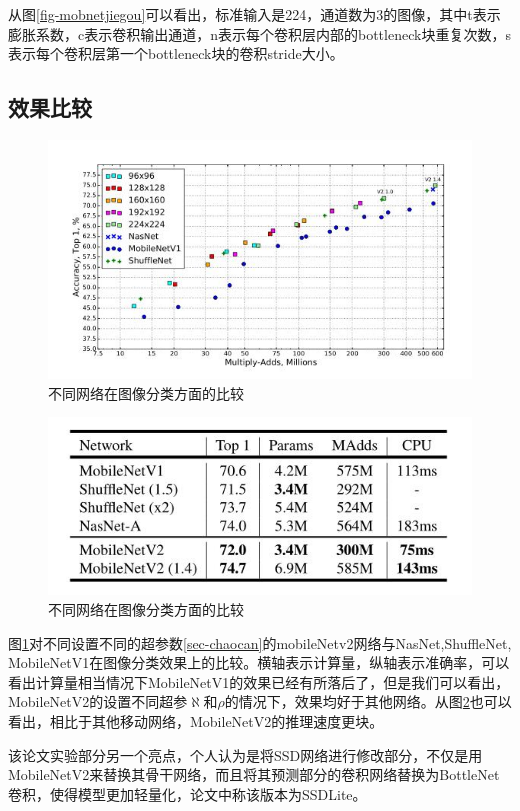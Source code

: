 \documentclass[UTF8,a4paper,12pt]{ctexart}
\begin{document}
从图\ref{fig-mobnetjiegou}可以看出，标准输入是224，通道数为3的图像，其中t表示膨胀系数，c表示卷积输出通道，n表示每个卷积层内部的bottleneck块重复次数，s表示每个卷积层第一个bottleneck块的卷积stride大小。
 
 
 \subsection{效果比较}
 
 
  \begin{figure}[htbp]
 	\centering
 	\includegraphics[width=0.5\linewidth]{webmin/不同分辨率.jpg}
 	\caption{不同网络在图像分类方面的比较}
 	\label{fig-tuxiangfenlei}
 \end{figure}
 
 
   \begin{figure}[htbp]
 	\centering
 	\includegraphics[width=0.5\linewidth]{webmin/不同分辨率2.jpg}
 	\caption{不同网络在图像分类方面的比较}
 	\label{fig-tuxiangfenlei2}
 \end{figure}
 
 图\ref{fig-tuxiangfenlei}对不同设置不同的超参数\ref{sec-chaocan}的mobileNetv2网络与NasNet\cite{NasNet},ShuffleNet\cite{ShuffleNet},\\MobileNetV1\cite{2017MobileNets}在图像分类效果上的比较。横轴表示计算量，纵轴表示准确率，可以看出计算量相当情况下MobileNetV1的效果已经有所落后了，但是我们可以看出，MobileNetV2的设置不同超参$\aleph$和$\rho$的情况下，效果均好于其他网络。从图\ref{fig-tuxiangfenlei2}也可以看出，相比于其他移动网络，MobileNetV2的推理速度更块。
 
 该论文实验部分另一个亮点，个人认为是将SSD\cite{21}网络进行修改部分，不仅是用MobileNetV2来替换其骨干网络，而且将其预测部分的卷积网络替换为BottleNet卷积，使得模型更加轻量化，论文中称该版本为SSDLite。
 
\end{document}
